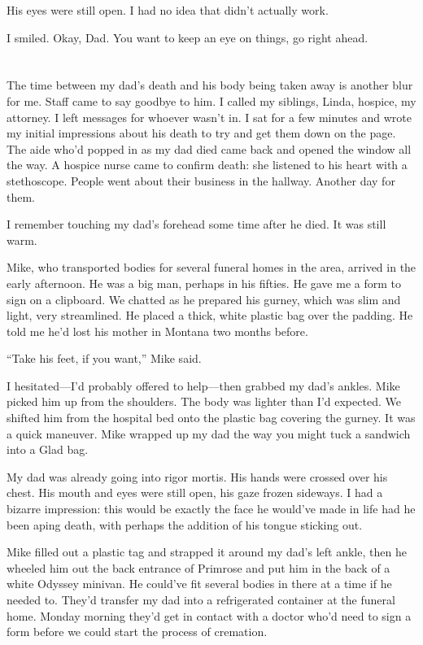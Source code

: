 \documentclass[12pt]{book}
\begin{document}
His eyes were still open. I had no idea that didn't actually work.

I smiled. Okay, Dad. You want to keep an eye on things, go right ahead. 


\chapter{}

The time between my dad's death and his body being taken away is another blur for me. Staff came to say goodbye to him. I called my siblings, Linda, hospice, my attorney. I left messages for whoever wasn't in. I sat for a few minutes and wrote my initial impressions about his death to try and get them down on the page. The aide who'd popped in as my dad died came back and opened the window all the way. A hospice nurse came to confirm death: she listened to his heart with a stethoscope. People went about their business in the hallway. Another day for them.

I remember touching my dad's forehead some time after he died. It was still warm.

Mike, who transported bodies for several funeral homes in the area, arrived in the early afternoon. He was a big man, perhaps in his fifties. He gave me a form to sign on a clipboard. We chatted as he prepared his gurney, which was slim and light, very streamlined. He placed a thick, white plastic bag over the padding. He told me he'd lost his mother in Montana two months before.

``Take his feet, if you want,'' Mike said.

I hesitated---I'd probably offered to help---then grabbed my dad's ankles. Mike picked him up from the shoulders. The body was lighter than I'd expected. We shifted him from the hospital bed onto the plastic bag covering the gurney. It was a quick maneuver. Mike wrapped up my dad the way you might tuck a sandwich into a Glad bag.

My dad was already going into rigor mortis. His hands were crossed over his chest. His mouth and eyes were still open, his gaze frozen sideways. I had a bizarre impression: this would be exactly the face he would've made in life had he been aping death, with perhaps the addition of his tongue sticking out.

Mike filled out a plastic tag and strapped it around my dad's left ankle, then he wheeled him out the back entrance of Primrose and put him in the back of a white Odyssey minivan. He could've fit several bodies in there at a time if he needed to. They'd transfer my dad into a refrigerated container at the funeral home. Monday morning they'd get in contact with a doctor who'd need to sign a form before we could start the process of cremation.
\end{document}
